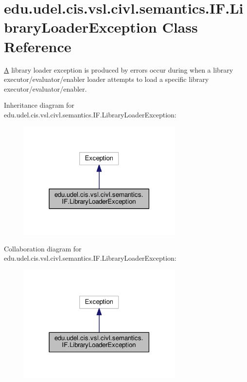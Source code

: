 \hypertarget{classedu_1_1udel_1_1cis_1_1vsl_1_1civl_1_1semantics_1_1IF_1_1LibraryLoaderException}{}\section{edu.\+udel.\+cis.\+vsl.\+civl.\+semantics.\+I\+F.\+Library\+Loader\+Exception Class Reference}
\label{classedu_1_1udel_1_1cis_1_1vsl_1_1civl_1_1semantics_1_1IF_1_1LibraryLoaderException}


\hyperlink{structA}{A} library loader exception is produced by errors occur during when a library executor/evaluator/enabler loader attempts to load a specific library executor/evaluator/enabler.  




Inheritance diagram for edu.\+udel.\+cis.\+vsl.\+civl.\+semantics.\+I\+F.\+Library\+Loader\+Exception\+:
\nopagebreak
\begin{figure}[H]
\begin{center}
\leavevmode
\includegraphics[width=234pt]{classedu_1_1udel_1_1cis_1_1vsl_1_1civl_1_1semantics_1_1IF_1_1LibraryLoaderException__inherit__graph}
\end{center}
\end{figure}


Collaboration diagram for edu.\+udel.\+cis.\+vsl.\+civl.\+semantics.\+I\+F.\+Library\+Loader\+Exception\+:
\nopagebreak
\begin{figure}[H]
\begin{center}
\leavevmode
\includegraphics[width=234pt]{classedu_1_1udel_1_1cis_1_1vsl_1_1civl_1_1semantics_1_1IF_1_1LibraryLoaderException__coll__graph}
\end{center}
\end{figure}

